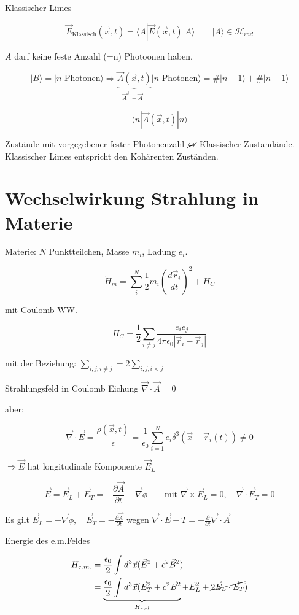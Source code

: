 Klassischer Limes

\[\vec E_{\text{Klassisch}}(\vec x,t) = \langle A|\vec E(\vec x,t)|A\rangle \qquad |A\rangle \in \mathcal H_{rad}\]

\(A\) darf keine feste Anzahl (=n) Photoonen haben. 

\[|B\rangle  = |n \text{ Photonen}\rangle  \Rightarrow \underbrace{\vec A(\vec x,t)}_{\vec A^++\vec A^-}|n \text{ Photonen}\rangle = \#|n-1\rangle +  \#|n+1\rangle  \]


\[\langle n| \vec A(\vec x,t)|n\rangle \]


Zustände mit vorgegebener fester Photonenzahl \(\cancel \Leftrightarrow \) Klassischer Zustandände. Klassischer Limes entspricht den Kohärenten Zuständen. 


\section{Wechselwirkung Strahlung in Materie}


Materie: \(N\) Punktteilchen, Masse \(m_i\), Ladung \(e_i\). 

\[\tilde H_m = \sum_i^N \frac{1}{2}m_i (\frac{d\vec r_i}{dt})^2 + H_C\]

mit Coulomb WW.

\[H_C = \frac{1}{2}\sum_{i\neq j} \frac{e_ie_j}{4\pi\epsilon_0|\vec r_i-\vec r_j|}\]

mit der Beziehung: \(\sum_{i,j;i\neq j} = 2\sum_{i,j;i<j}\)

Strahlungsfeld in Coulomb Eichung \(\vec \nabla\cdot\vec A = 0\)

aber:

\[ \vec \nabla\cdot\vec E = \frac{\rho (\vec x,t)}{\epsilon} = \frac{1}{\epsilon_0}\sum_{i=1}^N e_i\delta^3(\vec x-\vec r_i(t))\neq 0\]

\(\Rightarrow \vec E\) hat longitudinale Komponente \(\vec E_L\)

\[\vec E = \vec E_L + \vec E_T = -\frac{\partial \vec A}{\partial t}-\vec \nabla\phi\qquad\text{mit }\vec\nabla\times\vec E_L = 0,\quad\vec\nabla\cdot\vec E_T = 0\]


Es gilt \(\boxed{\vec E_L = -\vec \nabla\phi,\quad \vec E_T = -\frac{\partial \vec A}{\partial t}} \) wegen \(\vec \nabla\cdot\vec E-T = -\frac{\partial }{\partial t}\vec \nabla\cdot\vec A \)

Energie des e.m.Feldes

\begin{align}
H_{e.m.} &= \frac{\epsilon_0}{2}\int d^3\vec x(\vec E^2+c^2\vec B^2)\\
&=\underbrace{ \frac{\epsilon_0}{2}\int d^3\vec x(\vec E^2_T+c^2\vec B^2 }_{H_{red}} + \vec E_L^2+\cancel{2\vec E_L\cdot\vec E_T})
\end{align}

